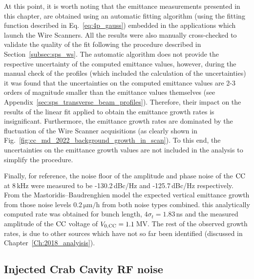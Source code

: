 At this point, it is worth noting that the emittance measurements presented in this chapter, are obtained using an automatic fitting algorithm (using the fitting function described in Eq.~\eqref{eq:4p_gauss}) embedded in the applications which launch the Wire Scanners. All the results were also manually cross-checked to validate the quality of the fit following the procedure described in Section~\ref{subsec:sps_ws}. The automatic algorithm does not provide the respective uncertainty of the computed emittance values, however, during the manual check of the profiles (which included the calculation of the uncertainties) it was found that the uncertainties on the computed emittance values are 2-3 orders of magnitude smaller than the emittance values themselves (see Appendix~\ref{sec:sps_transverse_beam_profiles}). Therefore, their impact on the results of the linear fit applied to obtain the emittance growth rates is insignificant. Furthermore, the emittance growth rates are dominated by the fluctuation of the Wire Scanner acquisitions (as clearly shown in Fig.~\ref{fig:cc_md_2022_background_growth_in_scan}). To this end, the uncertainties on the emittance growth values are not included in the analysis to simplify the procedure.


Finally, for reference, the noise floor of the amplitude and phase noise of the ${\mathrm{CC}}$ at 8\,kHz were measured to be -130.2\,dBc/Hz and -125.7\,dBc/Hz respectively. From the Mastoridis--Baudrenghien model the expected vertical emittance growth from those noise levels 0.2\,$\mathrm{\mu m/h}$ from both noise types combined. this analytically computed rate was obtained for bunch length, $4\sigma_t=1.83$\,ns and the measured amplitude of the ${\mathrm{CC}}$ voltage of ${V_\mathrm{0, CC}}=1.1$\,MV.
The rest of the observed growth rates, is due to other sources which have not so far been identified (discussed in Chapter~\ref{Ch:2018_analyisis}).



\subsection{Injected Crab Cavity RF noise}\label{sec:injected_cc_noise_2022}

